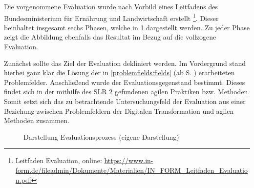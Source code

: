 Die vorgenommene Evaluation wurde nach Vorbild eines Leitfadens des Bundesministerium für Ernährung und Landwirtschaft erstellt \footnote{Leitfaden Evaluation, \newline online: \url{https://www.in-form.de/fileadmin/Dokumente/Materialien/IN_FORM_Leitfaden_Evaluation.pdf}}. Dieser beinhaltet insgesamt sechs Phasen, welche in \ref{fig:evaluation} dargestellt werden. Zu jeder Phase zeigt die Abbildung ebenfalls das Resultat im Bezug auf die  vollzogene Evaluation. 

Zunächst sollte das Ziel der Evaluation dekliniert werden. Im Vordergrund stand hierbei ganz klar die Lösung der in \ref{problemfields:fields} (ab S. \pageref{problemfields:fields}) erarbeiteten Problemfelder. Anschließend wurde der  Evaluationsgegenstand bestimmt. Dieses findet sich in der mithilfe des SLR 2 gefundenen agilen Praktiken bzw. Methoden. Somit setzt sich das zu betrachtende Untersuchungsfeld der Evaluation aus einer Beziehung zwischen Problemfeldern der Digitalen Transformation und agilen Methoden zusammen.

\begin{figure}[H]
	\centering
	\caption[Darstellung Evaluationsprozess]{Darstellung Evaluationsprozess (eigene Darstellung)}
	\label{fig:evaluation}
\end{figure}

